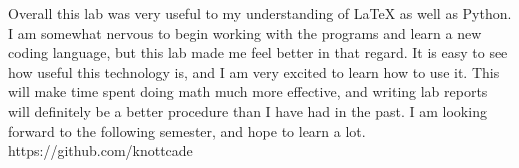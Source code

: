 Overall this lab was very useful to my understanding of LaTeX as well as Python. I am somewhat nervous to begin working with the programs and learn a new coding language, but this lab made me feel better in that regard. It is easy to see how useful this technology is, and I am very excited to learn how to use it. This will make time spent doing math much more effective, and writing lab reports will definitely be a better procedure than I have had in the past. I am looking forward to the following semester, and hope to learn a lot. \newline https://github.com/knottcade